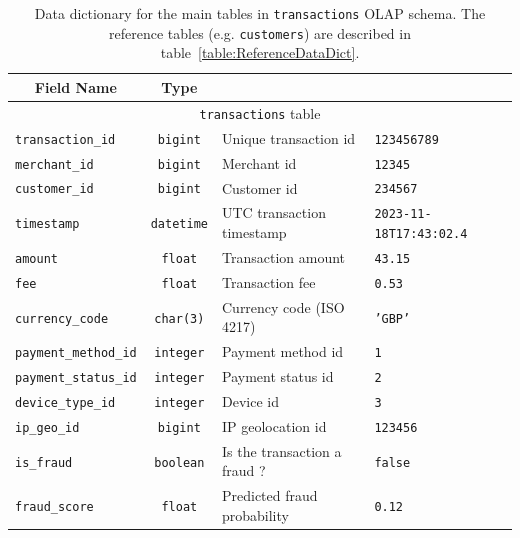\documentclass[11pt,a4paper,computermodern]{article}
\newcommand{\code}{\texttt}
\begin{document}
\begin{table}[!htb]
	\centering
	\begin{threeparttable}
		\caption{Data dictionary for the main tables in \code{transactions} OLAP schema. The reference tables (e.g. \code{customers}) are described in table~\ref{table:ReferenceDataDict}.}
		\label{table:OLAPDataDict}
		\begin{tabularx}{0.99\textwidth}{l c >{\arraybackslash}X >{\arraybackslash}X}
			\toprule
			\multicolumn{1}{c}{\textbf{Field Name}} & \multicolumn{1}{c}{\textbf{Type}} & \multicolumn{1}{c}{\textbf{Description}} & \multicolumn{1}{c}{\textbf{Example}} \\
			\midrule
			\multicolumn{4}{c}{\code{transactions} table}\\
			\code{transaction\_id} & \code{bigint} & Unique transaction id & \code{123456789} \\
			\code{merchant\_id} & \code{bigint} & Merchant id & \code{12345} \\
			\code{customer\_id} & \code{bigint} & Customer id & \code{234567} \\
			\code{timestamp} & \code{datetime} & UTC transaction timestamp & \code{2023-11-18T17:43:02.4} \\
			\code{amount} & \code{float} & Transaction amount & \code{43.15} \\
			\code{fee} & \code{float} & Transaction fee & \code{0.53} \\
			\code{currency\_code} & \code{char(3)} & Currency code (ISO 4217) & \code{'GBP'} \\
			\code{payment\_method\_id} & \code{integer} & Payment method id & \code{1} \\
			\code{payment\_status\_id} & \code{integer} & Payment status id & \code{2} \\
			\code{device\_type\_id} & \code{integer} & Device id & \code{3} \\
			\code{ip\_geo\_id} & \code{bigint} & IP geolocation id & \code{123456} \\
			\code{is\_fraud} & \code{boolean} & Is the transaction a fraud ? & \code{false} \\
			\code{fraud\_score} & \code{float} & Predicted fraud probability & \code{0.12} \\
			

\end{tabularx}
\end{threeparttable}
\end{table}
\end{document}
